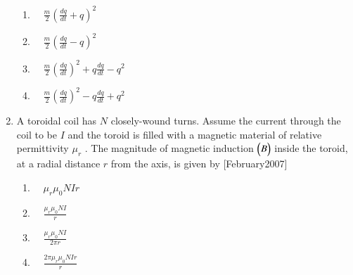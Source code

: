\documentclass[journal]{IEEEtran}
\begin{document}
\begin{enumerate}
\begin{enumerate}
\item $ \quad \frac{m}{2} \left( \frac{dq}{dt} + q \right)^2 $
\item $ \quad \frac{m}{2} \left( \frac{dq}{dt} - q \right)^2 $
\item $ \quad \frac{m}{2} \left( \frac{dq}{dt} \right)^2 + q \frac{dq}{dt} - q^2 $
\item $ \quad \frac{m}{2} \left( \frac{dq}{dt} \right)^2 - q \frac{dq}{dt} + q^2 $
\end{enumerate}
\item A toroidal coil has  $N$  closely-wound turns. Assume the current through the coil to be $I$ and the toroid is filled with a magnetic material of relative permittivity $ \mu_r$ . The magnitude of magnetic induction $\begin{pmatrix}B\end{pmatrix} $ inside the toroid, at a radial distance $r$  from the axis, is given by \hfill[February2007]

\begin{enumerate}
\item $ \quad \mu_r \mu_0 NIr $
\item $\quad \frac{\mu_r \mu_0 NI}{r} $
\item $ \quad \frac{\mu_r \mu_0 NI}{2 \pi r} $
\item $\quad \frac{2 \pi \mu_r \mu_0 NIr}{r} $
\end{enumerate}




\end{enumerate}
\end{document}
